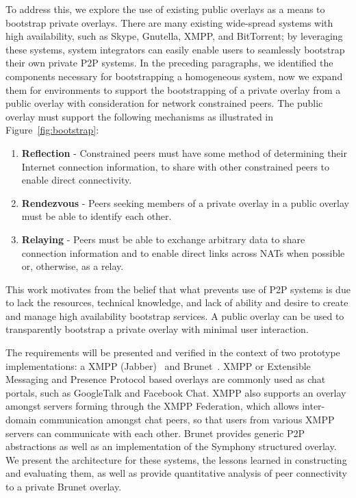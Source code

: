 \documentclass[conference]{IEEEtran}
\begin{document}
To address this, we explore the use of existing public overlays as a means to
bootstrap private overlays.  There are many existing wide-spread systems with
high availability, such as Skype, Gnutella, XMPP, and BitTorrent; by leveraging
these systems, system integrators can easily enable users to seamlessly
bootstrap their own private P2P systems.  In the preceding paragraphs, we
identified the components necessary for bootstrapping a homogeneous system, now
we expand them for environments to support the bootstrapping of a private
overlay from a public overlay with consideration for network constrained peers.
The public overlay must support the following mechanisms as illustrated in
Figure~\ref{fig:bootstrap}:
\begin{enumerate}
\item \textbf{Reflection} - Constrained peers must have some method of
determining their Internet connection information, to share with other
constrained peers to enable direct connectivity.
\item \textbf{Rendezvous} - Peers seeking members of a private overlay in a
public overlay must be able to identify each other.
\item \textbf{Relaying} - Peers must be able to exchange arbitrary data to
share connection information and to enable direct links across NATs when
possible or, otherwise, as a relay.
\end{enumerate}
This work motivates from the belief that what prevents use of P2P systems is
due to lack the resources, technical knowledge, and lack of ability and desire
to create and manage high availability bootstrap services.  A public overlay
can be used to transparently bootstrap a private overlay with minimal user
interaction.

The requirements will be presented and verified in the context of two prototype
implementations: a XMPP (Jabber)~\cite{xmpp} and Brunet~\cite{brunet}.  XMPP or
Extensible Messaging and Presence Protocol based overlays are commonly used as
chat portals, such as GoogleTalk and Facebook Chat.  XMPP also supports an
overlay amongst servers forming through the XMPP Federation, which allows
inter-domain communication amongst chat peers, so that users from various XMPP
servers can communicate with each other.  Brunet provides generic P2P
abstractions as well as an implementation of the Symphony structured overlay.
We present the architecture for these systems, the lessons learned in
constructing and evaluating them,  as well as provide quantitative analysis of
peer connectivity to a private Brunet overlay.
\end{document}
